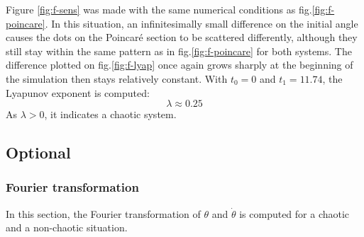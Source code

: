 \documentclass[a4paper,12pt,twoside]{article}
\begin{document}
Figure \ref{fig:f-sens} was made with the same numerical conditions as fig.\ref{fig:f-poincare}. In this situation, an infinitesimally small difference on the initial angle causes the dots on the Poincaré section to be scattered differently, although they still stay within the same pattern as in fig.\ref{fig:f-poincare} for both systems. The difference plotted on fig.\ref{fig:f-lyap} once again grows sharply at the beginning of the simulation then stays relatively constant. With $t_0=0$ and $t_1=11.74$, the Lyapunov exponent is computed:
\begin{equation*}
	\lambda \approx 0.25
\end{equation*}
As $\lambda > 0$, it indicates a chaotic system.

\subsection{Optional} %

\subsubsection{Fourier transformation}
In this section, the Fourier transformation of $\theta$ and $\dot{\theta}$ is computed for a chaotic and a non-chaotic situation.
\end{document}
